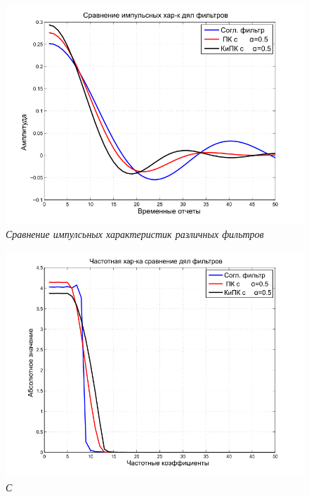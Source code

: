 \begin{figure}[H]
\centering
\includegraphics[width=0.9\columnwidth]{TIME_comp.png}
\caption{\textit{Сравнение импулсьных характеристик различных фильтров}} \label{fg_5}
\end{figure}
\begin{figure}[H]
\centering
\includegraphics[width=0.9\columnwidth]{FREQ_comp.png}
\caption{\textit{С}} \label{fg_6}
\end{figure}
\clearpage